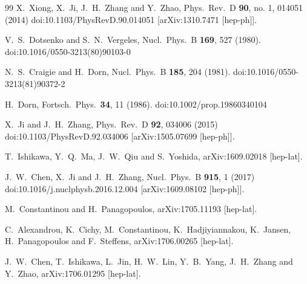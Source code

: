 \begin{thebibliography}{99}
	X.~Xiong, X.~Ji, J.~H.~Zhang and Y.~Zhao,
	Phys.\ Rev.\ D {\bf 90}, no. 1, 014051 (2014)
	doi:10.1103/PhysRevD.90.014051
	[arXiv:1310.7471 [hep-ph]].

  V.~S.~Dotsenko and S.~N.~Vergeles,
  Nucl.\ Phys.\ B {\bf 169}, 527 (1980).
  doi:10.1016/0550-3213(80)90103-0

  N.~S.~Craigie and H.~Dorn,
  Nucl.\ Phys.\ B {\bf 185}, 204 (1981).
  doi:10.1016/0550-3213(81)90372-2

  H.~Dorn,
  Fortsch.\ Phys.\  {\bf 34}, 11 (1986).
  doi:10.1002/prop.19860340104

  X.~Ji and J.~H.~Zhang,
  Phys.\ Rev.\ D {\bf 92}, 034006 (2015)
  doi:10.1103/PhysRevD.92.034006
  [arXiv:1505.07699 [hep-ph]].

  T.~Ishikawa, Y.~Q.~Ma, J.~W.~Qiu and S.~Yoshida,
  arXiv:1609.02018 [hep-lat].

  J.~W.~Chen, X.~Ji and J.~H.~Zhang,
  Nucl.\ Phys.\ B {\bf 915}, 1 (2017)
  doi:10.1016/j.nuclphysb.2016.12.004
  [arXiv:1609.08102 [hep-ph]].

  M.~Constantinou and H.~Panagopoulos,
  arXiv:1705.11193 [hep-lat].

  C.~Alexandrou, K.~Cichy, M.~Constantinou, K.~Hadjiyiannakou, K.~Jansen, H.~Panagopoulos and F.~Steffens,
  arXiv:1706.00265 [hep-lat].


J.~W.~Chen, T.~Ishikawa, L.~Jin, H.~W.~Lin, Y.~B.~Yang, J.~H.~Zhang and Y.~Zhao,
arXiv:1706.01295 [hep-lat].



\end{thebibliography}
